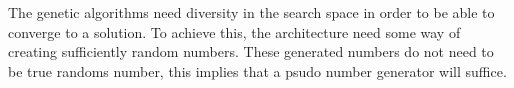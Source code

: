 The genetic algorithms need diversity in the search space in order to be able to converge to a solution. To achieve this, the architecture need some way of creating sufficiently random numbers. These generated numbers do not need to be true randoms number, this implies that a psudo number generator will suffice. 

